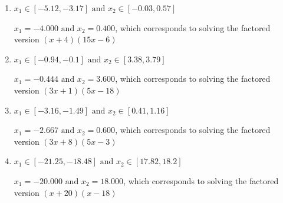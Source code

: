 \documentclass{extbook}[14pt]
\begin{document}
\begin{enumerate}
{\begin{enumerate}[label=\Alph*.]
* $x_1 = -1.333 \text{ and } x_2 = 1.200$, which is the correct option. Obtained by solving the factored version $(3x + 4)(5x -6)$
\item \( x_1 \in [-5.12, -3.17] \text{ and } x_2 \in [-0.03, 0.57] \)

$x_1 = -4.000 \text{ and } x_2 = 0.400$, which corresponds to solving the factored version $(x + 4)(15x -6)$
\item \( x_1 \in [-0.94, -0.1] \text{ and } x_2 \in [3.38, 3.79] \)

$x_1 = -0.444 \text{ and } x_2 = 3.600$, which corresponds to solving the factored version $(3x + 1)(5x -18)$
\item \( x_1 \in [-3.16, -1.49] \text{ and } x_2 \in [0.41, 1.16] \)

$x_1 = -2.667 \text{ and } x_2 = 0.600$, which corresponds to solving the factored version $(3x + 8)(5x -3)$
\item \( x_1 \in [-21.25, -18.48] \text{ and } x_2 \in [17.82, 18.2] \)

$x_1 = -20.000 \text{ and } x_2 = 18.000$, which corresponds to solving the factored version $(x + 20)(x -18)$
\end{enumerate}

}
\end{enumerate}
\end{document}
